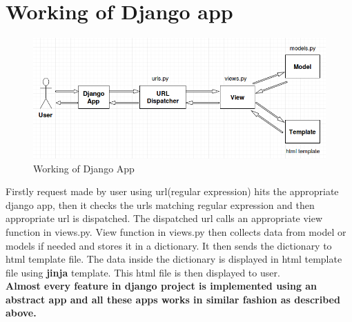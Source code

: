 \section{Working of Django app}
\begin{figure}[htp]
\center
\includegraphics[width=1.0\columnwidth]{djangoapp}
\caption{Working of Django App}
\label{fig:Working of Django App}
\end{figure}

Firstly request made by user using url(regular expression) hits the appropriate django  app, then it checks the urls matching regular expression and then appropriate url is dispatched. The dispatched url calls an appropriate view function in views.py. View function in views.py then collects data from model or models if needed and stores it in a dictionary. It then sends the dictionary to html template file. The data inside the dictionary is displayed in html template file using \textbf{jinja} template. This html file is then displayed to user.\\
\textbf{Almost every feature in django project is implemented using an abstract app and all these apps works in similar fashion as described above.}
